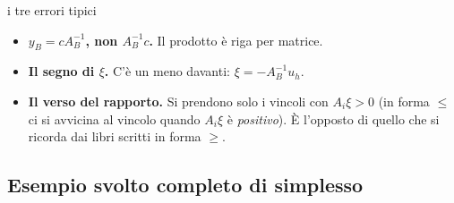 \documentclass[11pt,a4paper]{article}
\begin{document}
\begin{att}{i tre errori tipici}
\begin{itemize}
\item \textbf{$y_B = c A_B^{-1}$, non $A_B^{-1} c$.} Il prodotto è riga per matrice.
\item \textbf{Il segno di $\xi$.} C'è un meno davanti: $\xi = -A_B^{-1}u_h$.
\item \textbf{Il verso del rapporto.} Si prendono solo i vincoli con $A_i\xi > 0$
      (in forma $\le$ ci si avvicina al vincolo quando $A_i\xi$ è \emph{positivo}).
      È l'opposto di quello che si ricorda dai libri scritti in forma $\ge$.
\end{itemize}
\end{att}

\newpage
\subsection{Esempio svolto completo di simplesso}
\end{document}
